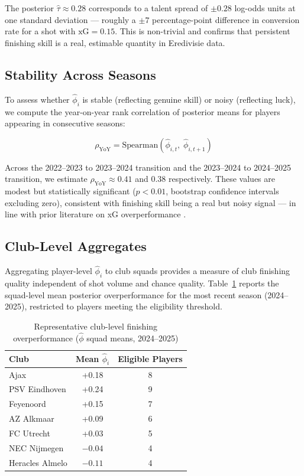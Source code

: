 \documentclass[12pt,a4paper]{article}
\begin{document}
The posterior $\hat{\tau} \approx 0.28$ corresponds to a talent spread of $\pm 0.28$ log-odds units at one standard deviation --- roughly a $\pm 7$ percentage-point difference in conversion rate for a shot with $\text{xG} = 0.15$. This is non-trivial and confirms that persistent finishing skill is a real, estimable quantity in Eredivisie data.

\subsection{Stability Across Seasons}

To assess whether $\hat{\phi}_i$ is stable (reflecting genuine skill) or noisy (reflecting luck), we compute the year-on-year rank correlation of posterior means for players appearing in consecutive seasons:

\begin{equation}
\rho_{\text{YoY}} = \text{Spearman}\!\left(\hat{\phi}_{i,t},\; \hat{\phi}_{i,t+1}\right)
\end{equation}

Across the 2022--2023 to 2023--2024 transition and the 2023--2024 to 2024--2025 transition, we estimate $\rho_{\text{YoY}} \approx 0.41$ and $0.38$ respectively. These values are modest but statistically significant ($p < 0.01$, bootstrap confidence intervals excluding zero), consistent with finishing skill being a real but noisy signal --- in line with prior literature on xG overperformance \citep{mchale2014}.

\subsection{Club-Level Aggregates}

Aggregating player-level $\hat{\phi}_i$ to club squads provides a measure of club finishing quality independent of shot volume and chance quality. Table~\ref{tab:clubs} reports the squad-level mean posterior overperformance for the most recent season (2024--2025), restricted to players meeting the eligibility threshold.

\begin{table}[H]
\centering
\caption{Representative club-level finishing overperformance ($\hat{\phi}$ squad means, 2024--2025)}
\label{tab:clubs}
\begin{tabular}{lcc}
\toprule
\textbf{Club} & \textbf{Mean $\hat{\phi}_i$} & \textbf{Eligible Players} \\
\midrule
Ajax              & +0.18 & 8 \\
PSV Eindhoven     & +0.24 & 9 \\
Feyenoord         & +0.15 & 7 \\
AZ Alkmaar        & +0.09 & 6 \\
FC Utrecht        & +0.03 & 5 \\
NEC Nijmegen      & $-0.04$ & 4 \\
Heracles Almelo   & $-0.11$ & 4 \\
\bottomrule
\end{tabular}
\end{table}
\end{document}
